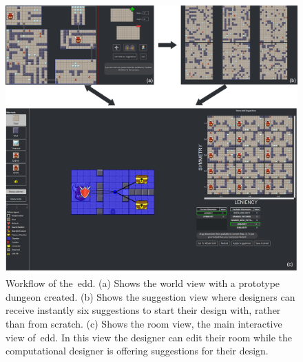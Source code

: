 \begin{figure}[!h]
\centerline{\includegraphics[width=\textwidth]{figures/EDD-figs/edd-workflow-2.png}}
\caption{Workflow of the~\acrlong{edd}. (a) Shows the world view with a prototype dungeon created. (b) Shows the suggestion view where designers can receive instantly six suggestions to start their design with, rather than from scratch. (c) Shows the room view, the main interactive view of~\acrshort{edd}. In this view the designer can edit their room while the computational designer is offering suggestions for their design.} \label{fig:eddWorkflow}
\end{figure}











